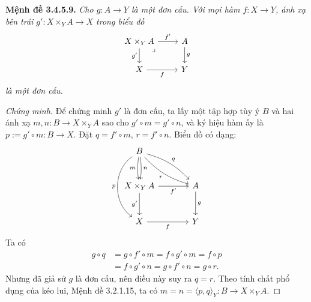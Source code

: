 \noindent\textbf{Mệnh đề 3.4.5.9.} \emph{Cho $g:A\to Y$ là một đơn cấu. Với mọi hàm $f:X\to Y$, ánh xạ bên trái $g':X\times_YA\to X$ trong biểu đồ}
\[\begin{tikzcd}X\times_YA\arrow[r,"f'"]\arrow[d,"g'"']\arrow[dr,phantom,"\lrcorner",very near start]&A\arrow[d,"g"]\\X\arrow[r,"f"']&Y\end{tikzcd}\]
\emph{là một đơn cấu.}
\begin{proof}[Chứng minh]
Để chứng minh $g'$ là đơn cấu, ta lấy một tập hợp tùy ý $B$ và hai ánh xạ $m,n:B\to X\times_YA$ sao cho $g'\circ m=g'\circ n$, và ký hiệu hàm ấy là $p:=g'\circ m:B\to X$. Đặt $q=f'\circ m$, $r=f'\circ n$. Biểu đồ có dạng:
\[\begin{tikzcd}[column sep=large,row sep=large]
B\arrow[d,bend right=8,"m"']\arrow[d,bend left=8,"n"]\arrow[dd,bend right=55,"p"']\arrow[dr,bend left=15,"q"]\arrow[dr,bend right=15,"r"']&\\
X\times_YA\arrow[r,"f'"']\arrow[d,"g'"']&A\arrow[d,"g"]\\X\arrow[r,"f"']&Y
\end{tikzcd}\]
Ta có
\begin{align*}
g\circ q&=g\circ f'\circ m=f\circ g'\circ m=f\circ p\\
&=f\circ g'\circ n=g\circ f'\circ n=g\circ r.
\end{align*}
Nhưng đã giả sử $g$ là đơn cấu, nên điều này suy ra $q=r$. Theo tính chất phổ dụng của kéo lui, Mệnh đề 3.2.1.15, ta có $m=n=\langle p,q\rangle_Y:B\to X\times_YA$.
\end{proof}

